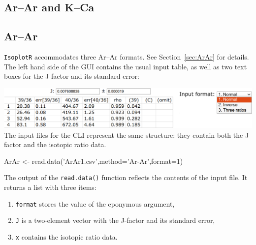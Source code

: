 \begin{refsection}

\chapter{Ar--Ar and K--Ca}
\label{ch:ArArKCa-R}

\section{Ar--Ar}\label{sec:ArAr-R}

\texttt{IsoplotR} accommodates three Ar--Ar formats. See
Section~\ref{sec:ArAr} for details. The left hand side of the GUI
contains the usual input table, as well as two text boxes for the
J-factor and its standard error:

\noindent\includegraphics[width=\linewidth]{../figures/ArArInputTableFormats.png}\\

The input files for the CLI represent the same structure: they contain
both the J factor and the isotopic ratio data.

\begin{console}
ArAr <- read.data('ArAr1.csv',method='Ar-Ar',format=1)
\end{console}

The output of the \texttt{read.data()} function reflects the contents
of the input file. It returns a list with three items:

\begin{enumerate}
\item\texttt{format} stores the value of the eponymous argument,
\item\texttt{J} is a two-element vector with the J-factor and its standard error,
\item\texttt{x} contains the isotopic ratio data.
\end{enumerate}
  

\end{refsection}
